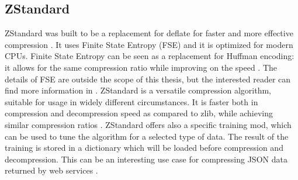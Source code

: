 \subsection{ZStandard}
ZStandard was built to be a replacement for deflate for faster and more effective compression
\cite{ColletY2018Smaller}. It uses Finite State Entropy (FSE) \cite{ColletY2013Finite}
and it is optimized for modern CPUs. Finite State Entropy can be seen as a replacement
for Huffman encoding: it allows for the same compression ratio while improving
on the speed \cite{ColletY2013Finite}. The details of FSE are outside the scope of
this thesis, but the interested reader can find more information in \cite{ColletY2013Finite}
\cite{ColletY2014FSE}.
ZStandard is a versatile compression algorithm, suitable for usage in widely
different circumstances. It is faster both in compression and decompression
speed as compared to zlib, while achieving similar compression ratios \cite{ColletY2018Smaller}.
ZStandard offers also a specific training mod, which can be used to tune the algorithm for a selected
type of data. The result of the training is stored in a dictionary which will be loaded before compression
and decompression. This can be an interesting use case for compressing
JSON data returned by web services \cite{ColletY2018Smaller}.
